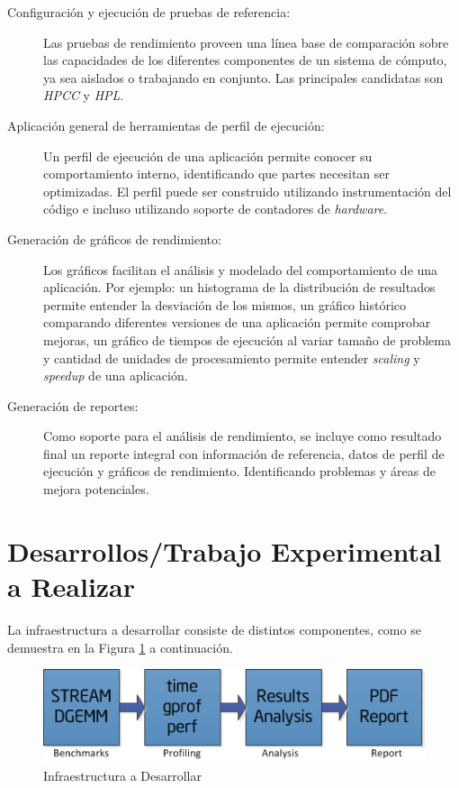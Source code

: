 \documentclass[a4paper]{article}
\begin{document}
\begin{description}
\item[Configuración y ejecución de pruebas de referencia:]

Las pruebas de rendimiento proveen una línea base de comparación sobre las capacidades de los diferentes componentes de un sistema de cómputo, ya sea aislados o trabajando en conjunto. Las principales candidatas son {\it HPCC} y {\it HPL}.

\item[Aplicación general de herramientas de perfil de ejecución:]

Un perfil de ejecución de una aplicación permite conocer su comportamiento interno, identificando que partes necesitan ser optimizadas. El perfil puede ser construido utilizando instrumentación del código e incluso utilizando soporte de contadores de {\it hardware}.

\item[Generación de gráficos de rendimiento:]

Los gráficos facilitan el análisis y modelado del comportamiento de una aplicación. Por ejemplo: un histograma de la distribución de resultados permite entender la desviación de los mismos, un gráfico histórico comparando diferentes versiones de una aplicación permite comprobar mejoras, un gráfico de tiempos de ejecución al variar tamaño de problema y cantidad de unidades de procesamiento permite entender {\it scaling} y {\it speedup} de una aplicación.

\item[Generación de reportes:]

Como soporte para el análisis de rendimiento, se incluye como resultado final un reporte integral con información de referencia, datos de perfil de ejecución y gráficos de rendimiento. Identificando problemas y áreas de mejora potenciales.

\end{description}

\section{Desarrollos/Trabajo Experimental a Realizar}

La infraestructura a desarrollar consiste de distintos componentes, como se demuestra en la Figura \ref{fig:framework} a continuación.

\begin{figure}[H]
\centering
\includegraphics{framework.png}
\caption{Infraestructura a Desarrollar}
\label{fig:framework}
\end{figure}
\end{document}
